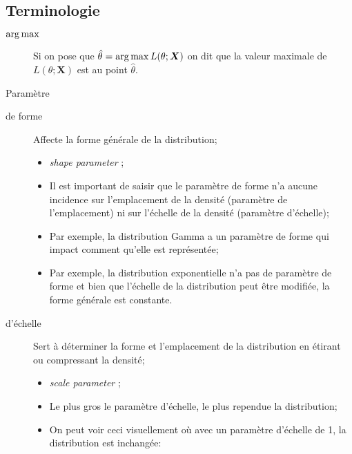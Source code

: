 \documentclass[10pt, french]{article}
\begin{document}
\begin{multicols*}{2}
\section{Terminologie}
\begin{description}
	\item[$\argmax$]	Si on pose que $\hat{\theta}	=	\argmax L(\theta; \bm{X})$ on dit que la valeur maximale de $L(\theta; \bm{X})$ est au point $\hat{\theta}$.
\end{description}

Paramètre
\begin{description}
	\item[de forme]	Affecte la forme générale de la distribution;
		\begin{itemize}
		\item	\og \textit{shape parameter} \fg{};
		\item	Il est important de saisir que le paramètre de forme n'a aucune incidence sur l'emplacement de la densité (paramètre de l'emplacement) ni sur l'échelle de la densité (paramètre d'échelle);
		\item	Par exemple, la distribution Gamma a un paramètre de forme qui impact comment qu'elle est représentée;
		\item	Par exemple, la distribution exponentielle n'a pas de paramètre de forme et bien que l'échelle de la distribution peut être modifiée, la forme générale est constante.
		\end{itemize}
	\item[d'échelle]	Sert à déterminer la forme et l'emplacement de la distribution en étirant ou compressant la densité;
		\begin{itemize}
		\item	\og \textit{scale parameter} \fg{};
		\item	Le plus gros le paramètre d'échelle, le plus rependue la distribution;
		\item	On peut voir ceci visuellement où avec un paramètre d'échelle de 1, la distribution est inchangée:
		\end{itemize}
		\begin{center}

\begin{tikzpicture}[x=0.75pt,y=0.75pt,yscale=-1,xscale=1]


\end{tikzpicture}
\end{center}
\end{description}
\end{multicols*}
\end{document}
